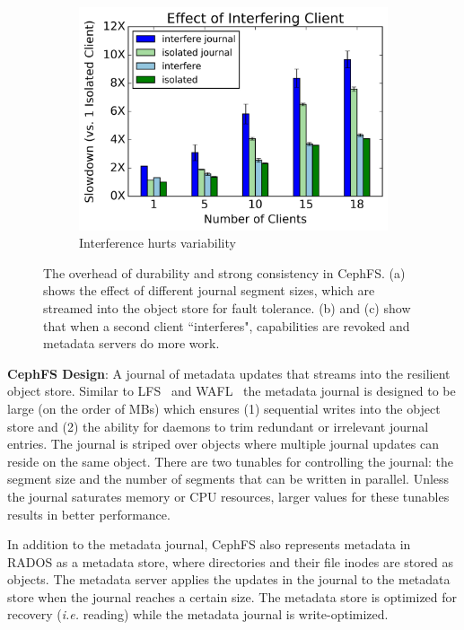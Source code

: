 \begin{figure}[t]
\begin{subfigure}[b]{.3\linewidth}
      \label{fig:overhead-b}
  \end{subfigure}
  \begin{subfigure}[b]{.3\linewidth}
      \centering
      \includegraphics[width=1.1\linewidth]{./chapters/cudele/figures/slowdown-interfere-scale.png}
      \caption{Interference hurts variability}
      \label{fig:overhead-c}
  \end{subfigure}
  \caption{The overhead of durability and strong consistency in CephFS.
  (a) shows the effect of different journal segment sizes, which are streamed
  into the object store for fault tolerance. (b) and (c) show that when a second
  client ``interferes", capabilities are revoked and metadata servers do more
  work.  \label{fig:overhead}}
\end{figure}

\textbf{CephFS Design}: A journal of metadata updates that streams into the
resilient object store. Similar to LFS~\cite{rosenblum:acm1992-LFS} and
WAFL~\cite{hitz:wtec1994-WAFL} the metadata journal is designed to be large
(on the order of MBs) which ensures (1) sequential writes into the object store
and (2) the ability for daemons to trim redundant or irrelevant journal
entries.  The journal is striped over objects where multiple journal updates
can reside on the same object. There are two tunables for controlling the
journal: the segment size and the number of segments that can be written in
parallel. Unless the journal saturates memory or CPU resources, larger values
for these tunables results in better performance.

In addition to the metadata journal, CephFS also represents metadata in RADOS
as a metadata store, where directories and their file inodes are stored as
objects.  The metadata server applies the updates in the journal to the
metadata store when the journal reaches a certain size. The metadata store is
optimized for recovery ({\it i.e.} reading) while the metadata journal is
write-optimized.


